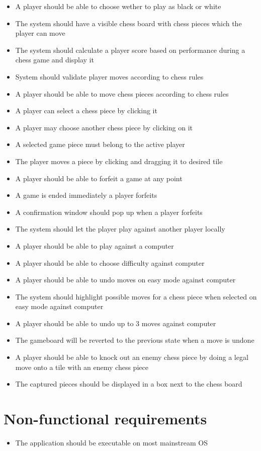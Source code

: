 \documentclass[letterpaper,11pt]{article}
\begin{document}
\begin{itemize}
	\item A player should be able to choose wether to play as black or white
	\item The system should have a visible chess board with chess pieces which the player can move
	\item The system should calculate a player score based on performance during a chess game and display it
	\item System should validate player moves according to chess rules
	\item A player should be able to move chess pieces according to chess rules
	\item A player can select a chess piece by clicking it
	\item A player may choose another chess piece by clicking on it
	\item A selected game piece must belong to the active player
	\item The player moves a piece by clicking and dragging it to desired tile
	\item A player should be able to forfeit a game at any point
	\item A game is ended immediately a player forfeits
	\item A confirmation window should pop up when a player forfeits
	\item The system should let the player play against another player locally
	\item A player should be able to play against a computer
	\item A player should be able to choose difficulty against computer
	\item A player should be able to undo moves on easy mode against computer
	\item The system should highlight possible moves for a chess piece when selected on easy mode against computer
	\item A player should be able to undo up to 3 moves against computer
	\item The gameboard will be reverted to the previous state when a move is undone
	\item A player should be able to knock out an enemy chess piece by doing a legal move onto a tile with an enemy chess piece
	\item The captured pieces should be displayed in a box next to the chess board
\end{itemize}

\section*{Non-functional requirements}
\begin{itemize}
	\item The application should be executable on most mainstream OS
\end{itemize}
\end{document}
